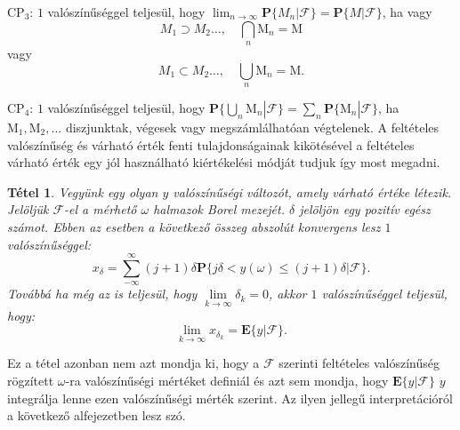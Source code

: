 \documentclass{article}
\newtheorem{theorem}{Tétel}
\begin{document}
CP$_3$: $1$ valószínűséggel teljesül, hogy $\lim_{n \to \infty} \mathrm{\textbf{P}} \{M_n | \mathscr{F} \} =\mathrm{\textbf{P}} \{M | \mathscr{F} \}$, ha vagy
\[
M_1 \supset M_2 \ldots,\quad  \bigcap\limits_{n} \mathrm{M}_n = \mathrm{M}
\]
vagy
\[
M_1 \subset M_2 \ldots, \quad \bigcup\limits_{n}  \mathrm{M}_n = \mathrm{M}.
\]

CP$_4$: $1$ valószínűséggel teljesül, hogy $\mathrm{\textbf{P}} \{ \bigcup\limits_{n}  \mathrm{M}_n | \mathscr{F} \} = \sum\limits_{n} \mathrm{\textbf{P}} \{ \mathrm{M}_n | \mathscr{F} \}$, ha $\mathrm{M}_1, \mathrm{M}_2, \ldots $ diszjunktak, végesek vagy megszámlálhatóan végtelenek. A feltételes valószínűség és várható érték fenti tulajdonságainak kikötésével a feltételes várható érték egy jól használható kiértékelési módját tudjuk így most megadni. 
\begin{theorem}\label{th:t8-4}
Vegyünk egy olyan $y$ valószínűségi változót, amely várható értéke létezik. Jelöljük $\mathscr{F}$-el a mérhető $\omega$ halmazok Borel mezejét. $\delta$ jelöljön egy pozitív egész számot. Ebben az esetben a következő összeg abszolút konvergens lesz $1$ valószínűséggel:
\begin{equation}
	x_{\delta} = \sum_{-\infty}^{\infty} (j+1) \delta\mathrm{\textbf{P}} \{ j\delta < y(\omega) \le (j+1)\delta | \mathscr{F} \}.
\end{equation}
	Továbbá ha még az is teljesül, hogy $\lim\limits_{k \to \infty } \delta_k = 0$, akkor $1$ valószínűséggel teljesül, hogy:
\begin{equation}
	\lim\limits_{k \to \infty } x_{\delta_k} = \mathrm{\textbf{E}}\{y | \mathscr{F}\}.
\end{equation}
\end{theorem}
Ez a tétel azonban nem azt mondja ki, hogy a $\mathscr{F}$ szerinti feltételes valószínűség rögzített $\omega$-ra valószínűségi mértéket definiál és azt sem mondja, hogy $\mathrm{\textbf{E}}\{y | \mathscr{F}\}$ $y$ integrálja lenne ezen valószínűségi mérték szerint. Az ilyen jellegű interpretációról a következő alfejezetben lesz szó. 
\end{document}
